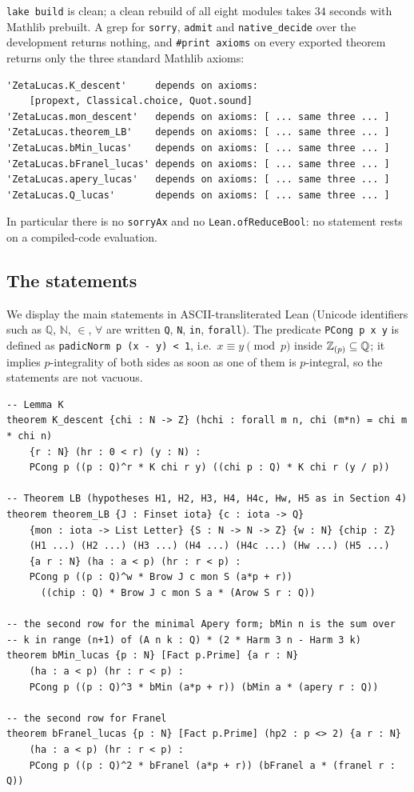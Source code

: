 \texttt{lake build} is clean; a clean rebuild of all eight modules takes $34$ seconds with
Mathlib prebuilt. A grep for \texttt{sorry}, \texttt{admit} and \texttt{native\_decide}
over the development returns nothing, and \texttt{\#print axioms} on every exported
theorem returns only the three standard Mathlib axioms:
\begin{verbatim}
'ZetaLucas.K_descent'     depends on axioms:
    [propext, Classical.choice, Quot.sound]
'ZetaLucas.mon_descent'   depends on axioms: [ ... same three ... ]
'ZetaLucas.theorem_LB'    depends on axioms: [ ... same three ... ]
'ZetaLucas.bMin_lucas'    depends on axioms: [ ... same three ... ]
'ZetaLucas.bFranel_lucas' depends on axioms: [ ... same three ... ]
'ZetaLucas.apery_lucas'   depends on axioms: [ ... same three ... ]
'ZetaLucas.Q_lucas'       depends on axioms: [ ... same three ... ]
\end{verbatim}
In particular there is no \texttt{sorryAx} and no \texttt{Lean.ofReduceBool}: no
statement rests on a compiled-code evaluation.

\subsection{The statements}

We display the main statements in ASCII-transliterated Lean (Unicode identifiers such as
$\mathbb Q$, $\mathbb N$, $\in$, $\forall$ are written \texttt{Q}, \texttt{N},
\texttt{in}, \texttt{forall}). The predicate \texttt{PCong p x y} is defined as
\texttt{padicNorm p (x - y) < 1}, i.e.\ $x\equiv y\pmod p$ inside $\mathbb{Z}_{(p)}\subseteq\mathbb{Q}$; it
implies $p$-integrality of both sides as soon as one of them is $p$-integral, so the
statements are not vacuous.

\begin{verbatim}
-- Lemma K
theorem K_descent {chi : N -> Z} (hchi : forall m n, chi (m*n) = chi m * chi n)
    {r : N} (hr : 0 < r) (y : N) :
    PCong p ((p : Q)^r * K chi r y) ((chi p : Q) * K chi r (y / p))

-- Theorem LB (hypotheses H1, H2, H3, H4, H4c, Hw, H5 as in Section 4)
theorem theorem_LB {J : Finset iota} {c : iota -> Q}
    {mon : iota -> List Letter} {S : N -> N -> Z} {w : N} {chip : Z}
    (H1 ...) (H2 ...) (H3 ...) (H4 ...) (H4c ...) (Hw ...) (H5 ...)
    {a r : N} (ha : a < p) (hr : r < p) :
    PCong p ((p : Q)^w * Brow J c mon S (a*p + r))
      ((chip : Q) * Brow J c mon S a * (Arow S r : Q))

-- the second row for the minimal Apery form; bMin n is the sum over
-- k in range (n+1) of (A n k : Q) * (2 * Harm 3 n - Harm 3 k)
theorem bMin_lucas {p : N} [Fact p.Prime] {a r : N}
    (ha : a < p) (hr : r < p) :
    PCong p ((p : Q)^3 * bMin (a*p + r)) (bMin a * (apery r : Q))

-- the second row for Franel
theorem bFranel_lucas {p : N} [Fact p.Prime] (hp2 : p <> 2) {a r : N}
    (ha : a < p) (hr : r < p) :
    PCong p ((p : Q)^2 * bFranel (a*p + r)) (bFranel a * (franel r : Q))
\end{verbatim}

